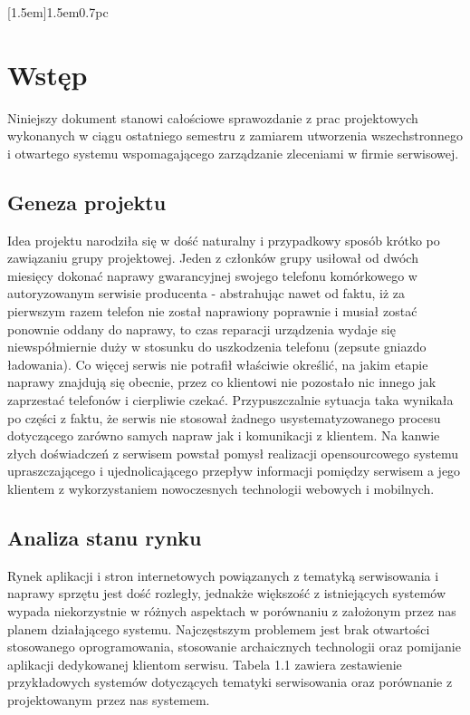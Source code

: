 \documentclass[a4paper,11pt]{article}
\begin{document}
\newpage
\maketitle
\newpage

[1.5em]{\addvspace{1pc}\bfseries}{1.5em}{0.7pc}

\renewcommand\lstlistingname{Listing}
\renewcommand\lstlistlistingname{Spis listingów}

\tableofcontents

\newpage

\makeatother

\section{Wstęp}
Niniejszy dokument stanowi całościowe sprawozdanie z prac projektowych wykonanych w ciągu ostatniego semestru z zamiarem utworzenia wszechstronnego i otwartego systemu wspomagającego zarządzanie zleceniami w firmie serwisowej.
\subsection{Geneza projektu}
Idea projektu narodziła się w dość naturalny i przypadkowy sposób krótko po zawiązaniu grupy projektowej. Jeden z członków grupy usiłował od dwóch miesięcy dokonać naprawy gwarancyjnej swojego telefonu komórkowego w autoryzowanym serwisie producenta - abstrahując nawet od faktu, iż za pierwszym razem telefon nie został naprawiony poprawnie i musiał zostać ponownie oddany do naprawy, to czas reparacji urządzenia wydaje się niewspółmiernie duży w stosunku do uszkodzenia telefonu (zepsute gniazdo ładowania). Co więcej serwis nie potrafił właściwie określić, na jakim etapie naprawy znajdują się obecnie, przez co klientowi nie pozostało nic innego jak zaprzestać telefonów i cierpliwie czekać. Przypuszczalnie sytuacja taka wynikała po części z faktu, że serwis nie stosował żadnego usystematyzowanego procesu dotyczącego zarówno samych napraw jak i komunikacji z klientem. Na kanwie złych doświadczeń z serwisem powstał pomysł realizacji opensourcowego systemu upraszczającego i ujednolicającego przepływ informacji pomiędzy serwisem a jego klientem z wykorzystaniem nowoczesnych technologii webowych i mobilnych.
\subsection{Analiza stanu rynku}
Rynek aplikacji i stron internetowych powiązanych z tematyką serwisowania i naprawy sprzętu jest dość rozległy, jednakże większość z istniejących systemów wypada niekorzystnie w różnych aspektach w porównaniu z założonym przez nas planem działającego systemu. Najczęstszym problemem jest brak otwartości stosowanego oprogramowania, stosowanie archaicznych technologii oraz pomijanie aplikacji dedykowanej klientom serwisu. Tabela 1.1 zawiera zestawienie przykładowych systemów dotyczących tematyki serwisowania oraz porównanie z projektowanym przez nas systemem.
\end{document}

